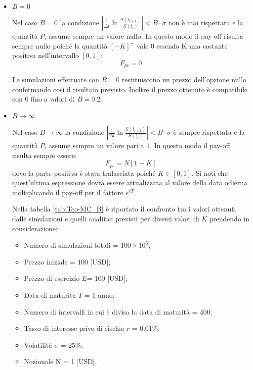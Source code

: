 \begin{itemize}
    \item $B=0$
    
    Nel caso $B=0$ la condizione $\left| \frac{1}{\Delta t} \ln{\frac{S(t_{i+1})}{S(t_i)}} \right| < B \cdot \sigma$ non è mai rispettata e la quantità $P_{i}$ assume sempre un valore nullo. In questo modo il pay-off risulta sempre nullo poiché la quantità $[-K]^{+}$ vale $0$ essendo K una costante positiva nell'intervallo $[0,1]$:
    \begin{equation}
        F_{pc} = 0
    \end{equation}
    
    Le simulazioni effettuate con $B=0$ restituiscono un prezzo dell'opzione nullo confermando così il risultato previsto. Inoltre il prezzo ottenuto è compatibile con 0 fino a valori di $B=0.2$.
    
    \item $B \rightarrow \infty$
    
    Nel caso $B \rightarrow \infty$ la condizione $\left| \frac{1}{\Delta t} \ln{\frac{S(t_{i+1})}{S(t_i)}} \right| < B \cdot \sigma$ è sempre rispettata e la quantità $P_{i}$ assume sempre un valore pari a $1$. In questo modo il pay-off risulta sempre essere:
    \begin{equation}
        F_{pc}=N[1-K]
    \end{equation}
    dove la parte positiva è stata tralasciata poiché $K \in [0,1]$. Si noti che quest'ultima espressione dovrà essere attualizzata al valore della data odierna moltiplicando il pay-off per il fattore $e^{r T}$.
    
    Nella tabella \ref{tab:Teo-MC_B} è riportato il confronto tra i valori ottenuti dalle simulazioni e quelli analitici previsti per diversi valori di $K$ prendendo in considerazione:
\begin{itemize}
    \item Numero di simulazioni totali = $100 \times 10^6$;
    \item Prezzo iniziale = 100 [USD];
    \item Prezzo di esercizio $E$= 100 [USD];
    \item Data di maturità $T$ = 1 anno; 
    \item Numero di intervalli in cui è divisa la data di maturità = 400;
    \item Tasso di interesse privo di rischio $r$ = $0.01\%$;
    \item Volatilità $\sigma$ = $25\%$;
    \item Nozionale N = 1 [USD].
\end{itemize}
    

\end{itemize}
